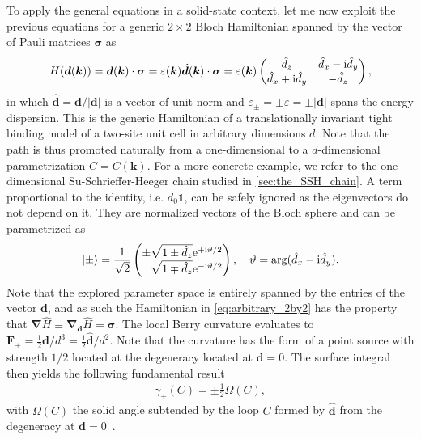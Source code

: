 To apply the general equations in a solid-state context, let me now exploit the previous equations for a generic $2\times 2$ Bloch Hamiltonian spanned by the vector of Pauli matrices $\bm\sigma$ as
\begin{align}
    H(\bm d(\bm k)) = \bm d(\bm k)\cdot\bm\sigma = \varepsilon(\bm k) \hat{\bm d}(\bm k)\cdot\bm\sigma
    =
    \varepsilon(\bm k)
    \begin{pmatrix}
        \hat{d}_z & \hat{d}_x - \mathrm i \hat{d}_y \\
        \hat{d}_x + \mathrm i \hat{d}_y & -\hat{d}_z
    \end{pmatrix},
    \label{eq:arbitrary_2by2}
\end{align}
in which $\hat{\bm d}={\bm d}/|\bm d|$ is a vector of unit norm and $\varepsilon_\pm = \pm\varepsilon = \pm|\bm d|$ spans the energy dispersion.
This is the generic Hamiltonian of a translationally invariant tight binding model of a two-site unit cell in arbitrary dimensions $d$.
Note that the path is thus promoted naturally from a one-dimensional to a $d$-dimensional parametrization $C=C(\bm k)$.
For a more concrete example, we refer to the one-dimensional Su-Schrieffer-Heeger chain studied in \cref{sec:the_SSH_chain}.
A term proportional to the identity, i.e. $d_0\mathbb 1$, can be safely ignored as the eigenvectors do not depend on it.
They are normalized vectors of the Bloch sphere and can be parametrized as
\begin{align}
    \ket{\pm} = \frac{1}{\sqrt{2}}
    \begin{pmatrix}
        \pm \sqrt{1 \pm \hat{d}_z}\re^{+\ri\vartheta/2}\\
        \phantom\pm\sqrt{1 \mp \hat{d}_z}\re^{-\ri\vartheta/2}
    \end{pmatrix}
    ,
    \quad
    \vartheta = \arg(\hat{d}_x-\ri \hat{d}_y).
\end{align}
Note that the explored parameter space is entirely spanned by the entries of the vector $\bm d$, and as such the Hamiltonian in \cref{eq:arbitrary_2by2} has the property that $\bm\nabla\hat H \equiv \bm\nabla_{\bm d}\hat H = \bm\sigma$.
The local Berry curvature evaluates to ${\bm F}_+ = \frac12\bm d/d^3=\frac12\hat{\bm d}/d^2$.
Note that the curvature has the form of a point source with strength $1/2$ located at the degeneracy located at $\bm d=0$.
The surface integral then yields the following fundamental result
\begin{align}
    \gamma_{\pm}(C) = \pm\frac12\Omega(C),
\end{align}
with $\Omega(C)$ the solid angle subtended by the loop $C$ formed by $\hat {\bm d}$ from the degeneracy at $\bm d=0$~\cite{Berry1984}.
